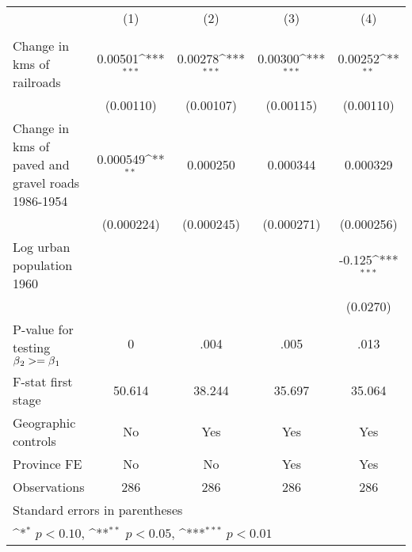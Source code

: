 {
\def\sym#1{\ifmmode^{#1}\else\(^{#1}\)\fi}
\begin{tabular}{l*{4}{c}}
\hline\hline
                &\multicolumn{1}{c}{(1)}&\multicolumn{1}{c}{(2)}&\multicolumn{1}{c}{(3)}&\multicolumn{1}{c}{(4)}\\
                &\multicolumn{1}{c}{}&\multicolumn{1}{c}{}&\multicolumn{1}{c}{}&\multicolumn{1}{c}{}\\
\hline
Change in kms of railroads&  0.00501\sym{***}&  0.00278\sym{***}&  0.00300\sym{***}&  0.00252\sym{**} \\
                &(0.00110)         &(0.00107)         &(0.00115)         &(0.00110)         \\
[1em]
Change in kms of paved and gravel roads 1986-1954& 0.000549\sym{**} & 0.000250         & 0.000344         & 0.000329         \\
                &(0.000224)         &(0.000245)         &(0.000271)         &(0.000256)         \\
[1em]
Log urban population 1960&                  &                  &                  &   -0.125\sym{***}\\
                &                  &                  &                  & (0.0270)         \\
\hline
P-value for testing $\beta\\_2 >= \beta\\_1$&        0         &     .004         &     .005         &     .013         \\
F-stat first stage&   50.614         &   38.244         &   35.697         &   35.064         \\
Geographic controls&       No         &      Yes         &      Yes         &      Yes         \\
Province FE     &       No         &       No         &      Yes         &      Yes         \\
Observations    &      286         &      286         &      286         &      286         \\
\hline\hline
\multicolumn{5}{l}{\footnotesize Standard errors in parentheses}\\
\multicolumn{5}{l}{\footnotesize \sym{*} \(p<0.10\), \sym{**} \(p<0.05\), \sym{***} \(p<0.01\)}\\
\end{tabular}
}
